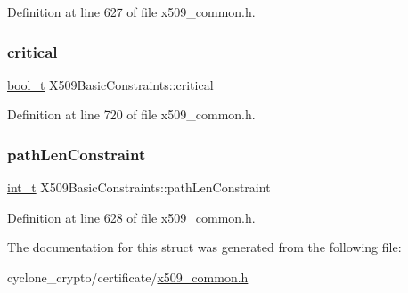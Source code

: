 Definition at line 627 of file x509\+\_\+common.\+h.

\mbox{\label{structX509BasicConstraints_a188f2fcfc8d1a8da81a6361affeb66e8}} 
\subsubsection{\texorpdfstring{critical}{critical}}
{\footnotesize\ttfamily \hyperlink{compiler__port_8h_a812d16e5494522586b3784e55d479912}{bool\+\_\+t} X509\+Basic\+Constraints\+::critical}



Definition at line 720 of file x509\+\_\+common.\+h.

\mbox{\label{structX509BasicConstraints_a13c129a1b79a0a489604e28d69dd0950}} 
\subsubsection{\texorpdfstring{path\+Len\+Constraint}{pathLenConstraint}}
{\footnotesize\ttfamily \hyperlink{compiler__port_8h_a022c65af7f6c8d3947e8a37d64db6ad6}{int\+\_\+t} X509\+Basic\+Constraints\+::path\+Len\+Constraint}



Definition at line 628 of file x509\+\_\+common.\+h.



The documentation for this struct was generated from the following file\+:\begin{DoxyCompactItemize}
\item 
cyclone\+\_\+crypto/certificate/\hyperlink{certificate_2x509__common_8h}{x509\+\_\+common.\+h}\end{DoxyCompactItemize}
